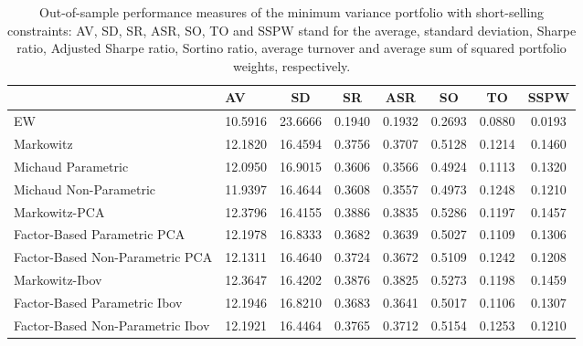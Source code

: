 \begin{table}

\caption{\label{tab:empirical_mvp}Out-of-sample performance measures of the minimum variance portfolio with short-selling constraints: AV, SD, SR, ASR, SO, TO and SSPW stand for the average, standard deviation, Sharpe ratio, Adjusted Sharpe ratio, Sortino ratio, average turnover and average sum of squared portfolio weights, respectively.}
\centering
\begin{tabular}[t]{l|l|c|c|c|c|c|c}
\hline
  & AV & SD & SR & ASR & SO & TO & SSPW\\
\hline
EW & 10.5916 & 23.6666 & 0.1940 & 0.1932 & 0.2693 & 0.0880 & 0.0193\\
\hline
Markowitz & 12.1820 & 16.4594 & 0.3756 & 0.3707 & 0.5128 & 0.1214 & 0.1460\\
\hline
Michaud Parametric & 12.0950 & 16.9015 & 0.3606 & 0.3566 & 0.4924 & 0.1113 & 0.1320\\
\hline
Michaud Non-Parametric & 11.9397 & 16.4644 & 0.3608 & 0.3557 & 0.4973 & 0.1248 & 0.1210\\
\hline
Markowitz-PCA & 12.3796 & 16.4155 & 0.3886 & 0.3835 & 0.5286 & 0.1197 & 0.1457\\
\hline
Factor-Based Parametric PCA & 12.1978 & 16.8333 & 0.3682 & 0.3639 & 0.5027 & 0.1109 & 0.1306\\
\hline
Factor-Based Non-Parametric PCA & 12.1311 & 16.4640 & 0.3724 & 0.3672 & 0.5109 & 0.1242 & 0.1208\\
\hline
Markowitz-Ibov & 12.3647 & 16.4202 & 0.3876 & 0.3825 & 0.5273 & 0.1198 & 0.1459\\
\hline
Factor-Based Parametric Ibov & 12.1946 & 16.8210 & 0.3683 & 0.3641 & 0.5017 & 0.1106 & 0.1307\\
\hline
Factor-Based Non-Parametric Ibov & 12.1921 & 16.4464 & 0.3765 & 0.3712 & 0.5154 & 0.1253 & 0.1210\\
\hline
\end{tabular}
\end{table}
